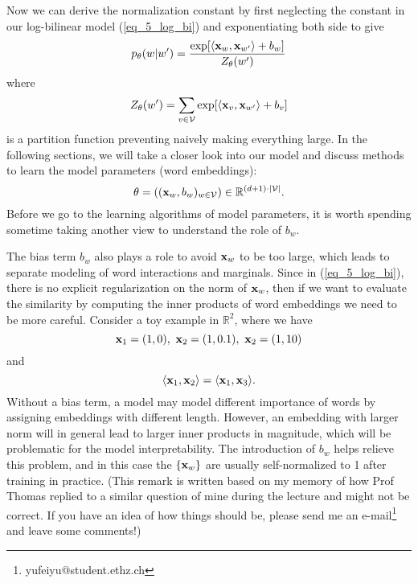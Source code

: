 \documentclass[../main.tex]{subfiles}
\begin{document}
\par Now we can derive the normalization constant by first neglecting the constant in our log-bilinear model (\ref{eq_5_log_bi}) and exponentiating both side to give
\begin{equation*}
p_{\theta}(w|w')=\frac{\exp[\langle {\bf x}_w,{\bf x}_{w'}\rangle + b_w]}{Z_{\theta}(w')}
\end{equation*}
where
\begin{equation*}
Z_{\theta}(w')= \sum_{v\in \mathcal{V}} \exp[\langle {\bf x}_v,{\bf x}_{w'}\rangle + b_v]
\end{equation*}
is a partition function preventing naively making everything large. In the following sections, we will take a closer look into our model and discuss methods to learn the model parameters (word embeddings):
\begin{equation*}
\theta = (({\bf x}_w,b_w)_{w\in \mathcal{V}})\in \mathbb{R}^{(d+1)\cdot |\mathcal{V}|}.
\end{equation*}
Before we go to the learning algorithms of model parameters, it is worth spending sometime taking another view to understand the role of $b_w$.
\begin{remark}
	The bias term $b_w$ also plays a role to avoid ${\bf x}_w$ to be too large, which leads to separate modeling of word interactions and marginals. Since in (\ref{eq_5_log_bi}), there is no explicit regularization on the norm of ${\bf x}_w$, then if we want to evaluate the similarity by computing the inner products of word embeddings we need to be more careful. Consider a toy example in $\mathbb{R}^2$, where we have
	\begin{equation*}
	{\bf x}_1 =(1, 0),\ {\bf x}_2=(1,0.1),\ {\bf x}_2=(1,10)
	\end{equation*}
	and 
	\begin{equation*}
	\langle {\bf x}_1,{\bf x}_2\rangle = \langle {\bf x}_1,{\bf x}_3\rangle.
	\end{equation*}
	Without a bias term, a model may model different importance of words by assigning embeddings with different length. However, an embedding with larger norm will in general lead to larger inner products in magnitude, which will be problematic for the model interpretability. The introduction of $b_w$ helps relieve this problem, and in this case the $\{{\bf x}_w\}$ are usually self-normalized to 1 after training in practice. (This remark is written based on my memory of how Prof Thomas replied to a similar question of mine during the lecture and might not be correct. If you have an idea of how things should be, please send me an e-mail\footnote{yufeiyu@student.ethz.ch} and leave some comments!)
\end{remark}
\end{document}
